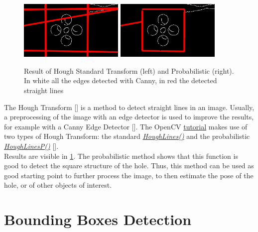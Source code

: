 \begin{figure}[H]
	\centering
		\includegraphics[width=5.0cm]{canny_HoughStandard}
		\qquad
		\includegraphics[width=5.0cm]{canny_HoughProb}
	\caption{Result of Hough Standard Transform (left) and Probabilistic (right). In white all the edges detected with Canny, in red the detected straight lines}
	\label{fig:HoughStandard}
\end{figure}

The Hough Transform [\cite{DudaHoughTrasf}] is a method to detect straight lines in an image. Usually, a preprocessing of the image with an edge detector is used to improve the results, for example with a Canny Edge Detector [\cite{CannyEdge}]. The OpenCV \href{https://docs.opencv.org/3.4/d9/db0/tutorial_hough_lines.html}{tutorial} makes use of two types of Hough Transform: the standard \href{https://docs.opencv.org/3.4/dd/d1a/group__imgproc__feature.html#ga46b4e588934f6c8dfd509cc6e0e4545a}{\textit{HoughLines()}} and the probabilistic \href{https://docs.opencv.org/3.4/dd/d1a/group__imgproc__feature.html#ga8618180a5948286384e3b7ca02f6feeb}{\textit{HoughLinesP()}} [\cite{houghprob}].\\
Results are visible in \ref{fig:HoughStandard}. The probabilistic method shows that this function is good to detect the square structure of the hole. 
Thus, this method can be used as good starting point to further process the image, to then estimate the pose of the hole, or of other objects of interest.

\section{Bounding Boxes Detection}

